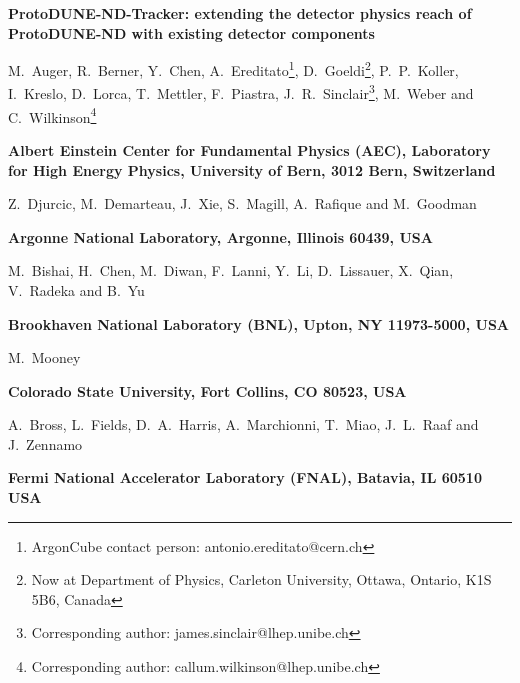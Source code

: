 \documentclass[a4paper]{article}
\begin{document}
\begin{center}
		
	{\Large \bf ProtoDUNE-ND-Tracker: extending the detector physics reach of ProtoDUNE-ND with existing detector components} 
	\vspace*{0.5cm}
	\setcounter{footnote}{0}  
	\def\A{\kern+.6ex\lower.42ex\hbox{$\scriptstyle \iota$}\kern-1.20ex a}
	\def\E{\kern+.5ex\lower.42ex\hbox{$\scriptstyle \iota$}\kern-1.10ex e}
	\small
	\newcommand{\Aname}[2]{#1}
	\def\titlefoot#1{\vspace{-0.3cm}\begin{center}{\bf #1}\end{center}}
	
	\Aname{M.~Auger}{Bern},
	\Aname{R.~Berner}{Bern},
	\Aname{Y.~Chen}{Bern},
	\Aname{A.~Ereditato\footnote{ArgonCube contact person: antonio.ereditato@cern.ch}}{Bern},
	\Aname{D.~Goeldi\footnote{Now at Department of Physics, Carleton University, Ottawa, Ontario, K1S 5B6, Canada}}{Bern},
	\Aname{P.~P.~Koller}{Bern},
	\Aname{I.~Kreslo}{Bern},
	\Aname{D.~Lorca}{Bern},
	\Aname{T.~Mettler}{Bern},
	\Aname{F.~Piastra}{Bern},
	\Aname{J.~R.~Sinclair\footnote{Corresponding author: james.sinclair@lhep.unibe.ch}}{Bern},
	\Aname{M.~Weber}{Bern} and
	\Aname{C.~Wilkinson\footnote{Corresponding author: callum.wilkinson@lhep.unibe.ch}}{Bern}
	\titlefoot{Albert Einstein Center for Fundamental Physics (AEC), Laboratory for High Energy Physics, University of Bern, 3012 Bern, Switzerland\label{Bern}}
	
	\Aname{Z.~Djurcic}{ANL},
	\Aname{M.~Demarteau}{ANL},
	\Aname{J.~Xie}{ANL},
	\Aname{S.~Magill}{ANL},
	\Aname{A.~Rafique}{ANL} and
	\Aname{M.~Goodman}{ANL}
	\titlefoot{Argonne National Laboratory, Argonne, Illinois 60439, USA\label{ANL}}
	
	\Aname{M.~Bishai}{BNL},
	\Aname{H.~Chen}{BNL},
	\Aname{M.~Diwan}{BNL},
	\Aname{F.~Lanni}{BNL},
	\Aname{Y.~Li}{BNL},
	\Aname{D.~Lissauer}{BNL},
	\Aname{X.~Qian}{BNL},
	\Aname{V.~Radeka}{BNL} and
	\Aname{B.~Yu}{BNL}
	\titlefoot{Brookhaven National Laboratory (BNL), Upton, NY 11973-5000, USA\label{BNL}}
	
	\Aname{M.~Mooney}{Colorado}
	\titlefoot{Colorado State University, Fort Collins, CO 80523, USA\label{colorado}}
	
	\Aname{A.~Bross}{FNAL},
	\Aname{L.~Fields}{FNAL},
	\Aname{D.~A.~Harris}{FNAL},
	\Aname{A.~Marchionni}{FNAL},
	\Aname{T.~Miao}{FNAL},
	\Aname{J.~L.~Raaf}{FNAL} and
	\Aname{J.~Zennamo}{FNAL}
	\titlefoot{Fermi National Accelerator Laboratory (FNAL), Batavia, IL 60510 USA\label{FNAL}}
	

\end{center}
\end{document}
